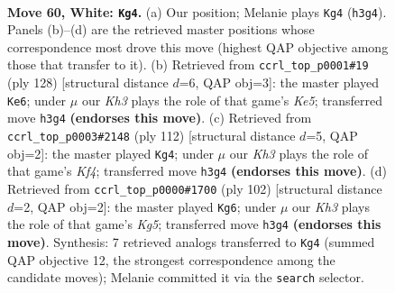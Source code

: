 \documentclass[11pt]{article}
\begin{document}
\clearpage

\begin{figure}[p]\centering
\begin{subfigure}{0.46\textwidth}\centering
\resizebox{\linewidth}{!}{%
\newchessgame
\chessboard[
  setfen={5r1k/3R4/P7/8/8/7K/8/8 w - - 5 60},
  showmover=false,
  pgfstyle=straightmove, color=movearrow, markmove={h3-g4}
]}
\caption{}
\end{subfigure}\hfill
\begin{subfigure}{0.46\textwidth}\centering
\resizebox{\linewidth}{!}{%
\newchessgame
\chessboard[
  setfen={3r1k2/R7/1p4B1/4K3/8/8/8/8 w - - 19 65},
  showmover=false,
  pgfstyle=straightmove, color=movearrow, markmove={e5-e6}
]}
\caption{}
\end{subfigure}
\\[4pt]
\begin{subfigure}{0.46\textwidth}\centering
\resizebox{\linewidth}{!}{%
\newchessgame
\chessboard[
  setfen={4r3/8/4k1p1/8/5K2/2P5/8/7R w - - 16 57},
  showmover=false,
  pgfstyle=straightmove, color=movearrow, markmove={f4-g4}
]}
\caption{}
\end{subfigure}\hfill
\begin{subfigure}{0.46\textwidth}\centering
\resizebox{\linewidth}{!}{%
\newchessgame
\chessboard[
  setfen={2r3k1/R7/4p3/6K1/8/7P/8/8 w - - 3 52},
  showmover=false,
  pgfstyle=straightmove, color=movearrow, markmove={g5-g6}
]}
\caption{}
\end{subfigure}
\caption{\textbf{Move 60, White: \texttt{Kg4}.} (a) Our position; Melanie plays \texttt{Kg4} (\texttt{h3g4}). Panels (b)--(d) are the retrieved master positions whose correspondence most drove this move (highest QAP objective among those that transfer to it). (b) Retrieved from \texttt{ccrl\_top\_p0001\#19} (ply 128) [structural distance $d$=6, QAP obj=3]: the master played \texttt{Ke6}; under $\mu$ our \emph{Kh3} plays the role of that game's \emph{Ke5}; transferred move \texttt{h3g4} \textbf{(endorses this move)}. (c) Retrieved from \texttt{ccrl\_top\_p0003\#2148} (ply 112) [structural distance $d$=5, QAP obj=2]: the master played \texttt{Kg4}; under $\mu$ our \emph{Kh3} plays the role of that game's \emph{Kf4}; transferred move \texttt{h3g4} \textbf{(endorses this move)}. (d) Retrieved from \texttt{ccrl\_top\_p0000\#1700} (ply 102) [structural distance $d$=2, QAP obj=2]: the master played \texttt{Kg6}; under $\mu$ our \emph{Kh3} plays the role of that game's \emph{Kg5}; transferred move \texttt{h3g4} \textbf{(endorses this move)}. Synthesis: 7 retrieved analogs transferred to \texttt{Kg4} (summed QAP objective 12, the strongest correspondence among the candidate moves); Melanie committed it via the \texttt{search} selector.}
\label{fig:thought-m118}
\end{figure}
\end{document}
